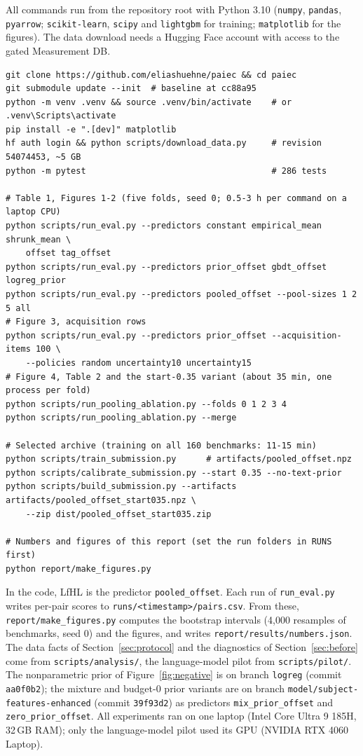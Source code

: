 \documentclass{article}
\newcommand{\lfhl}{LfHL}
\newcommand{\code}[1]{\texttt{#1}}
\begin{document}
All commands run from the repository root with Python 3.10 (\code{numpy}, \code{pandas}, \code{pyarrow}; \code{scikit-learn}, \code{scipy} and \code{lightgbm} for training; \code{matplotlib} for the figures). The data download needs a Hugging Face account with access to the gated Measurement DB.

\begin{footnotesize}
\begin{verbatim}
git clone https://github.com/eliashuehne/paiec && cd paiec
git submodule update --init  # baseline at cc88a95
python -m venv .venv && source .venv/bin/activate    # or .venv\Scripts\activate
pip install -e ".[dev]" matplotlib
hf auth login && python scripts/download_data.py     # revision 54074453, ~5 GB
python -m pytest                                     # 286 tests

# Table 1, Figures 1-2 (five folds, seed 0; 0.5-3 h per command on a laptop CPU)
python scripts/run_eval.py --predictors constant empirical_mean shrunk_mean \
    offset tag_offset
python scripts/run_eval.py --predictors prior_offset gbdt_offset logreg_prior
python scripts/run_eval.py --predictors pooled_offset --pool-sizes 1 2 5 all
# Figure 3, acquisition rows
python scripts/run_eval.py --predictors prior_offset --acquisition-items 100 \
    --policies random uncertainty10 uncertainty15
# Figure 4, Table 2 and the start-0.35 variant (about 35 min, one process per fold)
python scripts/run_pooling_ablation.py --folds 0 1 2 3 4
python scripts/run_pooling_ablation.py --merge

# Selected archive (training on all 160 benchmarks: 11-15 min)
python scripts/train_submission.py      # artifacts/pooled_offset.npz
python scripts/calibrate_submission.py --start 0.35 --no-text-prior
python scripts/build_submission.py --artifacts artifacts/pooled_offset_start035.npz \
    --zip dist/pooled_offset_start035.zip

# Numbers and figures of this report (set the run folders in RUNS first)
python report/make_figures.py
\end{verbatim}
\end{footnotesize}

{\raggedright In the code, \lfhl{} is the predictor \code{pooled\_offset}. Each run of \code{run\_eval.py} writes per-pair scores to \code{runs/<timestamp>/pairs.csv}. From these, \code{report/make\_figures.py} computes the bootstrap intervals (4{,}000 resamples of benchmarks, seed 0) and the figures, and writes \code{report/results/numbers.json}. The data facts of Section~\ref{sec:protocol} and the diagnostics of Section~\ref{sec:before} come from \code{scripts/analysis/}, the language-model pilot from \code{scripts/pilot/}. The nonparametric prior of Figure~\ref{fig:negative} is on branch \code{logreg} (commit \code{aa0f0b2}); the mixture and budget-0 prior variants are on branch \code{model/subject-features-enhanced} (commit \code{39f93d2}) as predictors \code{mix\_prior\_offset} and \code{zero\_prior\_offset}. All experiments ran on one laptop (Intel Core Ultra 9 185H, 32\,GB RAM); only the language-model pilot used its GPU (NVIDIA RTX 4060 Laptop).\par}
\end{document}
